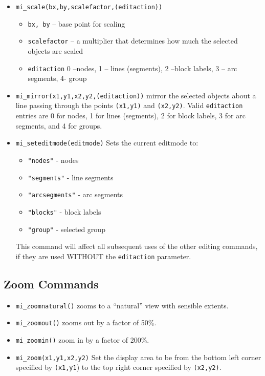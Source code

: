 \begin{itemize}
\item{\tt mi\_scale(bx,by,scalefactor,(editaction))}
        \begin{itemize}
        \item{\tt bx, by} -- base point for scaling
        \item{\tt scalefactor} -- a multiplier that determines how
        much the selected objects are scaled
        \item{\tt editaction}  0 --nodes, 1 -- lines (segments), 2 --block labels, 3 -- arc
                segments, 4- group
        \end{itemize}

\item{\tt mi\_mirror(x1,y1,x2,y2,(editaction))}
mirror the selected objects about a line passing through the points
{\tt (x1,y1)} and {\tt (x2,y2)}. Valid {\tt editaction} entries are
0 for nodes, 1 for lines (segments), 2 for block labels, 3 for arc
segments, and 4 for groups.

\item{\tt mi\_seteditmode(editmode)}
Sets the current editmode to:
        \begin{itemize}
        \item{\tt "nodes"} - nodes
        \item{\tt "segments"} - line segments
        \item{\tt "arcsegments"} - arc segments
        \item{\tt "blocks"} - block labels
        \item{\tt "group"} - selected group
        \end{itemize}
This command will affect all subsequent uses of the other editing
commands, if they are used WITHOUT the {\tt editaction} parameter.
\end{itemize}

\subsection{Zoom Commands}

\begin{itemize}
\item{\tt mi\_zoomnatural()} zooms to a ``natural'' view with sensible extents.
\item{\tt mi\_zoomout()} zooms out by a factor of 50\%.
\item{\tt mi\_zoomin()} zoom in by a factor of 200\%.
\item{\tt mi\_zoom(x1,y1,x2,y2)}
Set the display area to be from the bottom left corner specified by
{\tt (x1,y1}) to the top right corner specified by {\tt (x2,y2)}.
\end{itemize}

